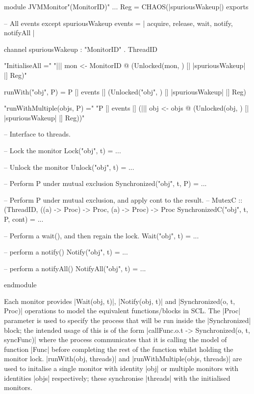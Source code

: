 \begin{cspm}[caption={The interface of the JVMMonitor module; changes from \cite{LoweJVMMonitor} are underlined}, label={listing::JVMMonitorInterface}]
module JVMMonitor"(MonitorID)"
    ...
    Reg = CHAOS({|spuriousWakeup|})
exports

    -- All events except spuriousWakeup
    events = {| acquire, release, wait, notify, notifyAll |}

    channel spuriousWakeup : "MonitorID" . ThreadID
  
    "InitialiseAll ="
      "||| mon <- MonitorID @ (Unlocked(mon, {})  [| {|spuriousWakeup|} |] Reg)"

    runWith("obj", P) = P [| events |] (Unlocked("obj", {})  [| {|spuriousWakeup|} |] Reg)

    "runWithMultiple(objs, P) ="
    "P [| events |] (||| obj <- objs @ (Unlocked(obj, {})  [| {|spuriousWakeup|} |] Reg))"

    -- Interface to threads.

    -- Lock the monitor
    Lock("obj", t) = ...

    -- Unlock the monitor
    Unlock("obj", t) = ...

    -- Perform P under mutual exclusion
    Synchronized("obj", t, P) = ...

    -- Perform P under mutual exclusion, and apply cont to the result. 
    -- MutexC :: (ThreadID, ((a) -> Proc) -> Proc, (a) -> Proc) -> Proc
    SynchronizedC("obj", t, P, cont) = ...

    -- Perform a wait(), and then regain the lock.
    Wait("obj", t) = ... 

    -- perform a notify()
    Notify("obj", t) = ...

    -- perform a notifyAll()
    NotifyAll("obj", t) = ...

endmodule
\end{cspm}



Each monitor provides |Wait(obj, t)|, |Notify(obj, t)| and |Synchronized(o, t, Proc)| operations to model the equivalent functions/blocks in SCL. The |Proc| parameter is used to specify the process that will be run inside the |Synchronized| block; the intended usage of this is of the form |callFunc.o.t -> Synchronized(o, t, syncFunc)| where the process communicates that it is calling the model of function |Func| before completing the rest of the function whilst holding the monitor lock. |runWith(obj, threads)| and |runWithMultiple(objs, threads)| are used to initalise a single monitor with identity |obj| or multiple monitors with identities |objs| respectively; these synchronise |threads| with the initialised monitors.%


% 

